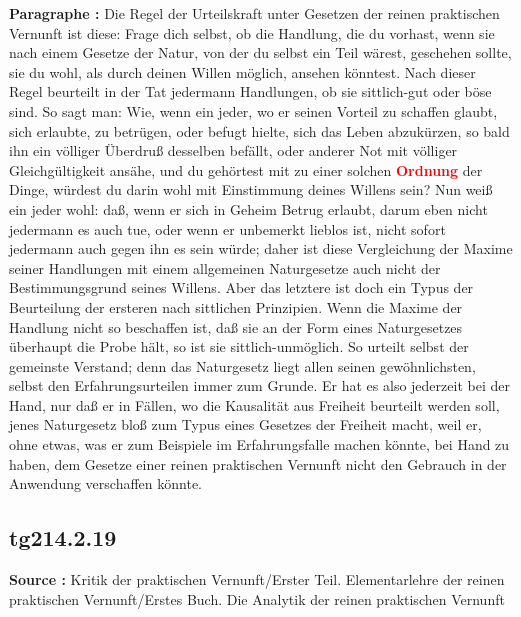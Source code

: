 \documentclass[a4paper,12pt,twoside]{book}
\newcommand{\match}[1]{\textcolor{red}{\textbf{#1}}}
\begin{document}
	\noindent\textbf{Paragraphe : }Die Regel der Urteilskraft unter Gesetzen der reinen praktischen Vernunft ist diese: Frage dich selbst, ob die Handlung, die du vorhast, wenn sie nach einem Gesetze der Natur, von der du selbst ein Teil wärest, geschehen sollte, sie du wohl, als durch deinen Willen möglich, ansehen könntest. Nach dieser Regel beurteilt in der Tat jedermann Handlungen, ob sie sittlich-gut oder böse sind. So sagt man: Wie, wenn ein jeder, wo er seinen Vorteil zu schaffen glaubt, sich erlaubte, zu betrügen, oder befugt hielte, sich das Leben abzukürzen, so bald ihn ein völliger Überdruß desselben befällt, oder anderer Not mit völliger Gleichgültigkeit ansähe,  und du gehörtest mit zu einer solchen \match{Ordnung} der Dinge, würdest du darin wohl mit Einstimmung deines Willens sein? Nun weiß ein jeder wohl: daß, wenn er sich in Geheim Betrug erlaubt, darum eben nicht jedermann es auch tue, oder wenn er unbemerkt lieblos ist, nicht sofort jedermann auch gegen ihn es sein würde; daher ist diese Vergleichung der Maxime seiner Handlungen mit einem allgemeinen Naturgesetze auch nicht der Bestimmungsgrund seines Willens. Aber das letztere ist doch ein Typus der Beurteilung der ersteren nach sittlichen Prinzipien. Wenn die Maxime der Handlung nicht so beschaffen ist, daß sie an der Form eines Naturgesetzes überhaupt die Probe hält, so ist sie sittlich-unmöglich. So urteilt selbst der gemeinste Verstand; denn das Naturgesetz liegt allen seinen gewöhnlichsten, selbst den Erfahrungsurteilen immer zum Grunde. Er hat es also jederzeit bei der Hand, nur daß er in Fällen, wo die Kausalität aus Freiheit beurteilt werden soll, jenes Naturgesetz bloß zum Typus eines Gesetzes der Freiheit macht, weil er, ohne etwas, was er zum Beispiele im Erfahrungsfalle machen könnte, bei Hand zu haben, dem Gesetze einer reinen praktischen Vernunft nicht den Gebrauch in der Anwendung verschaffen könnte. 
	
	\subsection*{tg214.2.19} 
	\textbf{Source : }Kritik der praktischen Vernunft/Erster Teil. Elementarlehre der reinen praktischen Vernunft/Erstes Buch. Die Analytik der reinen praktischen Vernunft\\  
	
\end{document}
